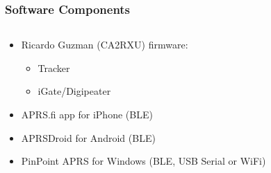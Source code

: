 \documentclass[aspectratio=169]{beamer}
\begin{document}
\begin{frame}[t]
  \frametitle{Software Components}
  \begin{columns}
    \begin{column}{0.66\textwidth}
      \begin{itemize}
        \item Ricardo Guzman (CA2RXU) firmware:
        \medskip
        \begin{itemize}
          \item Tracker
          \medskip
          \item iGate/Digipeater
        \end{itemize}
        \medskip
        \item APRS.fi app for iPhone (BLE)
        \medskip
        \item APRSDroid for Android (BLE)
        \medskip
        \item PinPoint APRS for Windows (BLE, USB Serial or WiFi)
      \end{itemize}
    \end{column}
    \begin{column}{0.33\textwidth}
    \end{column}
  \end{columns}
\end{frame}
\end{document}
